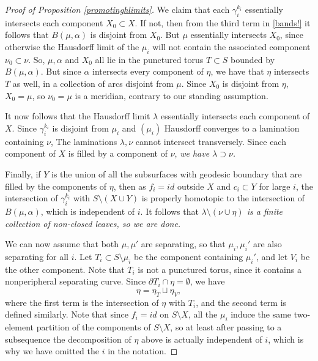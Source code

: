 \documentclass[12pt]{amsart}
\theoremstyle{definition}
\theoremstyle{remark}
\begin{document}
\begin{proof}[Proof of Proposition \ref{promotinghlimits}]
We claim that each $\gamma_i^{k_i}$ essentially intersects each component $X_0 \subset X$. If not, then from the third term in \eqref{bands!} it follows that $B(\mu,\alpha)$ is disjoint from $X_0$. But $\mu$ essentially intersects $X_0$, since otherwise the Hausdorff limit of the $\mu_i$ will not contain the associated component $\nu_0 \subset \nu$. So, $\mu,\alpha$ and $X_0$ all lie in the punctured torus $T\subset S$ bounded by $B(\mu,\alpha)$. But since $\alpha$ intersects every component of $\eta$, we have that $\eta$ intersects $T$ as well, in a collection of arcs disjoint from $\mu$. Since $X_0$ is disjoint from $\eta$, $X_0=\mu$, so $\nu_0=\mu$ is a meridian, contrary to our standing assumption.

It now follows that the Hausdorff limit $\lambda $ essentially intersects each component of $X$. Since $\gamma_i^{k_i}$ is disjoint from $\mu_i$ and $(\mu_i)$ Hausdorff converges to a lamination containing $\nu$, The laminations $\lambda,\nu$ cannot intersect transversely. Since  each component of $X$ is filled by a component of $\nu$, \it we have $\lambda \supset \nu$.\rm

Finally, if $Y$ is the union of all the subsurfaces with geodesic boundary that are filled by the components of $\eta$, then as $f_i=id$ outside $X$ and $c_i \subset Y$ for large $i$, the intersection of $\gamma_i^{k_i}$ with $S \setminus (X \cup Y)$ is properly homotopic to the intersection of  $B(\mu,\alpha)$, which is independent of $i$. It follows that \it $\lambda \setminus (\nu \cup \eta)$ is a finite collection of non-closed leaves, \rm so we are done.

\medskip 

We can now assume that both $\mu,\mu'$ are separating, so that $\mu_i,\mu_i'$ are also separating for all $i$. Let $T_i \subset S \setminus \mu_i$ be the component containing $\mu_i'$, and let $V_i $ be the other component. Note that $T_i$ is not a punctured torus, since it contains a nonperipheral separating curve. Since $\partial T_i \cap \eta =\emptyset$, we have $$\eta = \eta_{T} \sqcup \eta_{V},$$ 
where the first term is the intersection of $\eta$ with $T_i$, and the second term is defined similarly. Note that since $f_i=id$ on $S\setminus X$, all the $\mu_i$ induce the same two-element partition of the components of $S \setminus X$, so at least after passing to a subsequence the decomposition of $\eta$ above is actually independent of $i$, which is why we have omitted the $i$ in the notation. 


\end{proof}
\end{document}
